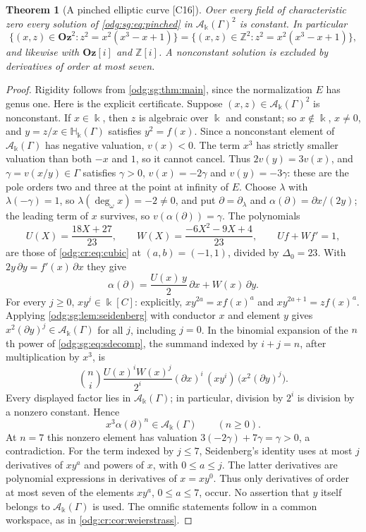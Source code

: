 \documentclass[11pt,oneside]{article}
\numberwithin{equation}{section}
\newtheorem{theorem}{Theorem}[section]
\theoremstyle{definition}
\theoremstyle{remark}
\newcommand{\Oz}{\mathbf{Oz}}
\newcommand{\Z}{\mathbb Z}
\newcommand{\ddeg}{\operatorname{deg}_{\omega}}
\newcommand{\src}[1]{\textup{\textsf{\small[#1]}}}
\newcommand{\Og}{\Oz[i]}
\newcommand{\crH}{\mathbb H_\Bbbk(\Gamma)}
\newcommand{\crA}{\mathcal A_\Bbbk(\Gamma)}
\begin{document}
\begin{theorem}[A pinched elliptic curve \src{C16}]\label{odg:sg:thm:example}
Over every field of characteristic zero every solution of \eqref{odg:sg:eq:pinched} in
$\crA^2$ is constant. In particular
\[
 \{(x,z)\in\Oz^2:z^2=x^2(x^3-x+1)\}=\{(x,z)\in\Z^2:z^2=x^2(x^3-x+1)\},
\]
and likewise with $\Og$ and $\Z[i]$. A nonconstant solution is excluded by derivatives of
order at most seven.
\end{theorem}
\begin{proof}
Rigidity follows from \cref{odg:sg:thm:main}, since the normalization $E$ has genus one.
Here is the explicit certificate. Suppose $(x,z)\in\crA^2$ is nonconstant. If $x\in\Bbbk$,
then $z$ is algebraic over $\Bbbk$ and constant; so $x\notin\Bbbk$, $x\ne0$, and
$y=z/x\in\crH$ satisfies $y^2=f(x)$. Since a nonconstant element of $\crA$
has negative valuation, $v(x)<0$. The term $x^3$ has strictly smaller
valuation than both $-x$ and $1$, so it cannot cancel. Thus
$2v(y)=3v(x)$, and $\gamma=v(x/y)\in\Gamma$
satisfies $\gamma>0$, $v(x)=-2\gamma$ and $v(y)=-3\gamma$: these are the pole orders two and
three at the point at infinity of $E$. Choose $\lambda$ with $\lambda(-\gamma)=1$, so
$\lambda(\ddeg x)=-2\ne0$, and put $\partial=\partial_\lambda$ and
$\alpha(\partial)=\partial x/(2y)$; the leading term of $x$ survives, so
$v(\alpha(\partial))=\gamma$. The polynomials
\begin{equation}\label{odg:sg:eq:bezout}
 U(X)=\frac{18X+27}{23},\qquad W(X)=\frac{-6X^2-9X+4}{23},\qquad Uf+Wf'=1,
\end{equation}
are those of \eqref{odg:cr:eq:cubic} at $(a,b)=(-1,1)$, divided by $\Delta_0=23$. With
$2y\,\partial y=f'(x)\,\partial x$ they give
\begin{equation}\label{odg:sg:eq:sdecomp}
 \alpha(\partial)=\frac{U(x)\,y}{2}\,\partial x+W(x)\,\partial y .
\end{equation}
For every $j\ge0$, $xy^j\in\Bbbk[C]$: explicitly,
$xy^{2a}=xf(x)^a$ and $xy^{2a+1}=zf(x)^a$. Applying
\cref{odg:sg:lem:seidenberg} with conductor $x$ and element $y$ gives
$x^2(\partial y)^j\in\crA$ for all $j$, including $j=0$.
In the binomial expansion of the $n$th power of \eqref{odg:sg:eq:sdecomp},
the summand indexed by $i+j=n$, after multiplication by $x^3$, is
\[
 \binom ni \frac{U(x)^iW(x)^j}{2^i}
 (\partial x)^i\,(xy^i)\,\bigl(x^2(\partial y)^j\bigr).
\]
Every displayed factor lies in $\crA$; in particular, division by $2^i$
is division by a nonzero constant. Hence
\begin{equation}\label{odg:sg:eq:ellipticcert}
 x^3\alpha(\partial)^n\in\crA\qquad(n\ge0).
\end{equation}
At $n=7$ this nonzero element has valuation $3(-2\gamma)+7\gamma=\gamma>0$, a contradiction.
For the term indexed by $j\le7$, Seidenberg's identity uses at most $j$
derivatives of $xy^a$ and powers of $x$, with $0\le a\le j$.
The latter derivatives are polynomial expressions in derivatives of $x=xy^0$.
Thus only derivatives of order at most seven of the elements $xy^a$,
$0\le a\le7$, occur. No assertion that $y$ itself belongs to $\crA$ is used. The
omnific statements follow in a common workspace, as in \cref{odg:cr:cor:weierstrass}.
\end{proof}
\end{document}
